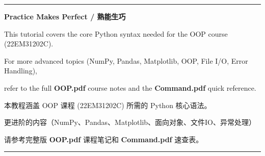 \documentclass[11pt,a4paper]{report}
\begin{document}
\begin{center}
\rule{\linewidth}{0.3pt}
\vspace{0.5cm}
{\large \textbf{Practice Makes Perfect / 熟能生巧}}
\vspace{0.3cm}

This tutorial covers the core Python syntax needed for the OOP course (22EM31202C).

For more advanced topics (NumPy, Pandas, Matplotlib, OOP, File I/O, Error Handling),

refer to the full \textbf{OOP.pdf} course notes and the \textbf{Command.pdf} quick reference.

本教程涵盖 OOP 课程 (22EM31202C) 所需的 Python 核心语法。

更进阶的内容（NumPy、Pandas、Matplotlib、面向对象、文件IO、异常处理）

请参考完整版 \textbf{OOP.pdf} 课程笔记和 \textbf{Command.pdf} 速查表。

\vspace{0.5cm}
\rule{\linewidth}{0.3pt}
\end{center}
\end{document}
